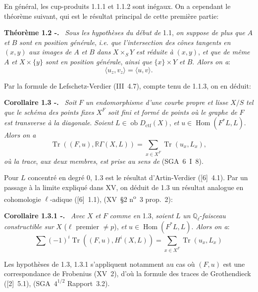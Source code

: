 \documentclass[11pt]{article}
\newenvironment{statement}[1]{\par\medskip\noindent\textbf{#1.}\ }{\par\medskip}
\DeclareMathOperator{\Hom}{Hom}
\newcommand{\R}{\mathbb{R}}\newcommand{\RHomCore}{\mathbb{R}\mathrm{Hom}}
\newcommand{\ob}{\operatorname{ob}}
\providecommand{\ctf}{\mathrm{ctf}}
\providecommand{\Tr}{\operatorname{Tr}}
\providecommand{\Tr}{\operatorname{Tr}}
\providecommand{\Tr}{\operatorname{Tr}}
\providecommand{\Hom}{\operatorname{Hom}}
\providecommand{\ob}{\operatorname{ob}}
\providecommand{\R}{\mathrm R}
\providecommand{\Tr}{\operatorname{Tr}}
\providecommand{\Hom}{\operatorname{Hom}}
\providecommand{\Tr}{\operatorname{Tr}}
\begin{document}
En général, les cup-produits 1.1.1 et 1.1.2 sont inégaux. On a cependant le théorème suivant, qui est le résultat principal de cette première partie:

\begin{statement}{Théorème 1.2 -}
\emph{Sous les hypothèses du début de} 1.1, \emph{on suppose de plus que} $A$ \emph{et} $B$ \emph{sont en position générale}, \emph{i.e. que l'intersection des cônes tangents en} $(x,y)$ \emph{aux images de} $A$ \emph{et} $B$ \emph{dans} $X\times_S Y$ \emph{est réduite à} $(x,y)$, \emph{et que de même} $A$ \emph{et} $X\times\{y\}$ \emph{sont en position générale}, \emph{ainsi que} $\{x\}\times Y$ \emph{et} $B$. \emph{Alors on a}:
\begin{equation}\tag{1.2.1}
\langle u_z,v_z\rangle=\langle u,v\rangle.
\end{equation}
\end{statement}

Par la
formule de Lefschetz-Verdier (III~4.7), compte tenu de 1.1.3, on en déduit:

\begin{statement}{Corollaire 1.3 -}
\emph{Soit} $F$ \emph{un endomorphisme d'une courbe propre et lisse} $X/S$ \emph{tel que le schéma des points fixes} $X^F$ \emph{soit fini et formé de points où le graphe de} $F$ \emph{est transverse à la diagonale}. \emph{Soient} $L\in\ob D_{\ctf}(X)$, \emph{et} $u\in\Hom(F^*L,L)$. \emph{Alors on a}
\[
\Tr((F,u),\R\Gamma(X,L))=\sum_{x\in X^F}\Tr(u_x,L_x),
\]
\emph{où la trace}, \emph{aux deux membres}, \emph{est prise au sens de} (SGA~6~I~8).
\end{statement}

Pour $L$ concentré en degré $0$, 1.3 est le résultat d'Artin-Verdier ([6]~4.1). Par un passage à la limite expliqué dans XV, on déduit de 1.3 un résultat analogue en cohomologie $\ell$-adique ([6]~1.1), (XV~\S2 n\textsuperscript{o}~3 prop.~2):

\begin{statement}{Corollaire 1.3.1 -}
\emph{Avec} $X$ \emph{et} $F$ \emph{comme en} 1.3, \emph{soient} $L$ \emph{un} $\mathbb Q_\ell$-\emph{faisceau constructible sur} $X$ ($\ell$ premier $\ne p$), \emph{et} $u\in\Hom(F^*L,L)$. \emph{Alors on a}:
\[
\sum(-1)^i\Tr((F,u),H^i(X,L))=\sum_{x\in X^F}\Tr(u_x,L_x)
\]
\end{statement}

Les hypothèses de 1.3, 1.3.1 s'appliquent notamment au cas où $(F,u)$ est une correspondance de Frobenius (XV~2), d'où la formule des traces de Grothendieck ([2]~5.1), (SGA~$4^{1/2}$ Rapport~3.2).
\end{document}
